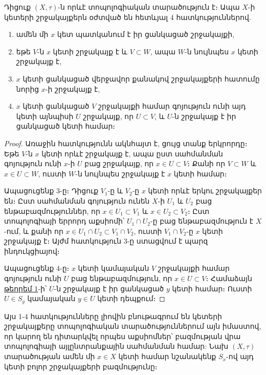\documentclass[./main.tex]{subfiles}
\begin{document}
\begin{theorem}\label{ch4thm2}
Դիցուք $(X, \tau )$-ն որևէ տոպոլոգիական տարածություն է։ Ապա $X$-ի կետերի շրջակայքերն օժտված են հետևյալ 4 հատկություններով.
\begin{enumerate}
\item ամեն մի $x$ կետ պատկանում է իր ցանկացած շրջակայքի,
\item եթե $V$-ն $x$ կետի շրջակայք է և $V \subset W$, ապա $W$-ն նույնպես $x$ կետի շրջակայք է,
\item $x$ կետի ցանկացած վերջավոր քանակով շրջակայքերի հատումը նորից $x$-ի շրջակայք է,
\item $x$ կետի ցանկացած $V$ շրջակայքի համար գոյություն ունի այդ կետի այնպիսի $U$ շրջակայք, որ $U \subset V$, և $U$-ն շրջակայք է իր ցանկացած կետի համար։
\end{enumerate}
\end{theorem}
\begin{proof}
Առաջին հատկությունն ակնհայտ է, ցույց տանք երկրորդը։ Եթե $V$-ն $x$ կետի որևէ շրջակայք է, ապա ըստ սահմանման գոյություն ունի $x$-ի $U$ բաց շրջակայք, որ $x \in U \subset V$։ Քանի որ $V \subset W$ և $x \in U \subset W$, ուստի $W$-ն նույնպես շրջակայք է $x$ կետի համար։

\par Ապացուցենք 3-ը։ Դիցուք $V_1$-ը և $V_2$-ը $x$ կետի որևէ երկու շրջակայքեր են։ \linebreak Ըստ սահմանման գոյություն ունեն $X$-ի $U_1$ և $U_2$ բաց ենթաբազմություններ, որ $x \in U_1 \subset V_1$ և $x \in U_2 \subset V_2$։ Ըստ տոպոլոգիայի երրորդ աքսիոմի՝ $U_1 \cap U_2$-ը բաց ենթաբազմություն է $X$-ում, և քանի որ $x \in U_1 \cap U_2 \subset V_1 \cap V_2 $, ուստի $V_1 \cap V_2 $-ը $x$ կետի շրջակայք է։ Այժմ հատկություն 3-ը ստացվում է պարզ ինդուկցիայով։

\par Ապացուցենք 4-ը։ $x$ կետի կամայական $V$ շրջակայքի համար գոյություն ունի $U$ բաց ենթաբազմություն, որ $x \in U \subset V$։ Համաձայն \hyperref[ch4thm1]{թեորեմ 1}-ի՝ $U$-ն շրջակայք է իր ցանկացած $y$ կետի համար։ Ուստի $U \in S_y$ կամայական $y \in U $ կետի դեպքում։
\end{proof}

\par Այս 1-4 հատկությունները լիովին բնութագրում են կետերի շրջակայքերը տոպո\-լո\-գիա\-կան տարածություններում այն իմաստով, որ կարող են դիտարկվել որպես աքսիոմներ՝ բազմության վրա տոպոլոգիայի այլընտ\-րանքա\-յին սահմանման համար: Նախ $(X, \tau )$  տարածության ամեն մի $x\in X$ կետի համար նշանակենք $S_x$-ով այդ կետի բոլոր շրջակայքերի բազմությունը։ 
\end{document}

